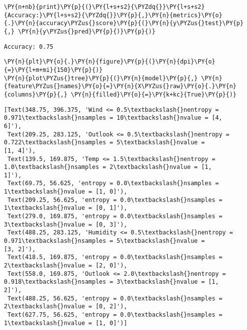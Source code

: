     \begin{tcolorbox}[breakable, size=fbox, boxrule=1pt, pad at break*=1mm,colback=cellbackground, colframe=cellborder]
\begin{Verbatim}[commandchars=\\\{\}]
\PY{n+nb}{print}\PY{p}{(}\PY{l+s+s2}{\PYZdq{}}\PY{l+s+s2}{Accuracy:}\PY{l+s+s2}{\PYZdq{}}\PY{p}{,}\PY{n}{metrics}\PY{o}{.}\PY{n}{accuracy\PYZus{}score}\PY{p}{(}\PY{n}{y\PYZus{}test}\PY{p}{,} \PY{n}{y\PYZus{}pred}\PY{p}{)}\PY{p}{)}
\end{Verbatim}
\end{tcolorbox}

    \begin{Verbatim}[commandchars=\\\{\}]
Accuracy: 0.75
    \end{Verbatim}

    \begin{tcolorbox}[breakable, size=fbox, boxrule=1pt, pad at break*=1mm,colback=cellbackground, colframe=cellborder]
\begin{Verbatim}[commandchars=\\\{\}]
\PY{n}{plt}\PY{o}{.}\PY{n}{figure}\PY{p}{(}\PY{n}{dpi}\PY{o}{=}\PY{l+m+mi}{150}\PY{p}{)}
\PY{n}{plot\PYZus{}tree}\PY{p}{(}\PY{n}{model}\PY{p}{,} \PY{n}{feature\PYZus{}names}\PY{o}{=}\PY{n}{X\PYZus{}raw}\PY{o}{.}\PY{n}{columns}\PY{p}{,} \PY{n}{filled}\PY{o}{=}\PY{k+kc}{True}\PY{p}{)}
\end{Verbatim}
\end{tcolorbox}

            \begin{tcolorbox}[breakable, size=fbox, boxrule=.5pt, pad at break*=1mm, opacityfill=0]
\begin{Verbatim}[commandchars=\\\{\}]
[Text(348.75, 396.375, 'Wind <= 0.5\textbackslash{}nentropy = 0.971\textbackslash{}nsamples = 10\textbackslash{}nvalue = [4,
6]'),
 Text(209.25, 283.125, 'Outlook <= 0.5\textbackslash{}nentropy = 0.722\textbackslash{}nsamples = 5\textbackslash{}nvalue =
[1, 4]'),
 Text(139.5, 169.875, 'Temp <= 1.5\textbackslash{}nentropy = 1.0\textbackslash{}nsamples = 2\textbackslash{}nvalue = [1,
1]'),
 Text(69.75, 56.625, 'entropy = 0.0\textbackslash{}nsamples = 1\textbackslash{}nvalue = [1, 0]'),
 Text(209.25, 56.625, 'entropy = 0.0\textbackslash{}nsamples = 1\textbackslash{}nvalue = [0, 1]'),
 Text(279.0, 169.875, 'entropy = 0.0\textbackslash{}nsamples = 3\textbackslash{}nvalue = [0, 3]'),
 Text(488.25, 283.125, 'Humidity <= 0.5\textbackslash{}nentropy = 0.971\textbackslash{}nsamples = 5\textbackslash{}nvalue =
[3, 2]'),
 Text(418.5, 169.875, 'entropy = 0.0\textbackslash{}nsamples = 2\textbackslash{}nvalue = [2, 0]'),
 Text(558.0, 169.875, 'Outlook <= 2.0\textbackslash{}nentropy = 0.918\textbackslash{}nsamples = 3\textbackslash{}nvalue = [1,
2]'),
 Text(488.25, 56.625, 'entropy = 0.0\textbackslash{}nsamples = 2\textbackslash{}nvalue = [0, 2]'),
 Text(627.75, 56.625, 'entropy = 0.0\textbackslash{}nsamples = 1\textbackslash{}nvalue = [1, 0]')]
\end{Verbatim}
\end{tcolorbox}
        
